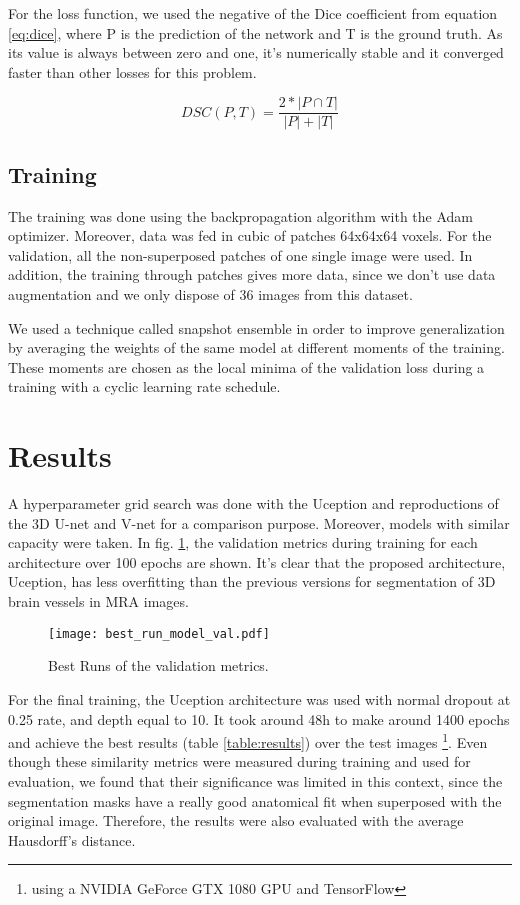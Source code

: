 \documentclass{article}
\begin{document}
For the loss function, we used the negative of the Dice coefficient from equation \ref{eq:dice}, where \textsc{P} is the prediction of the network and \textsc{T} is the ground truth. As its value is always between zero and one, it's numerically stable and it converged faster than other losses for this problem.

\begin{equation}
\label{eq:dice}
DSC(P,T) = \frac{2*|P \cap T|}{ |P|+|T|}
\end{equation}

\subsection{Training}
The training was done using the backpropagation algorithm with the Adam optimizer. Moreover, data was fed in cubic of patches 64x64x64 voxels. For the validation, all the non-superposed patches of one single image were used. In addition, the training through patches gives more data, since we don't use data augmentation and we only dispose of 36 images from this dataset.

We used a technique called snapshot ensemble \cite{Huang2017} in order to improve generalization by averaging the weights of the same model at different moments of the training. These moments are chosen as the local minima of the validation loss during a training with a cyclic learning rate schedule.

\section{Results}

A hyperparameter grid search was done with the Uception and reproductions of the 3D U-net and V-net for a comparison purpose. Moreover, models with similar capacity were taken. In fig. \ref{fig:best_val}, the validation metrics during training for each architecture over 100 epochs are shown. It's clear that the proposed architecture, Uception, has less overfitting than the previous versions for segmentation of 3D brain vessels in MRA images.

\begin{figure}[ht]
\texttt{[image: best\_run\_model\_val.pdf]}
\caption{Best Runs of the validation metrics.}
\label{fig:best_val}
\end{figure}

For the final training, the Uception architecture was used with normal dropout at 0.25 rate, and depth equal to 10. It took around 48h to make around 1400 epochs and achieve the best results (table \ref{table:results}) over the test images \footnote{using a NVIDIA GeForce GTX 1080 GPU and TensorFlow}.  Even though these similarity metrics were measured during training and used for evaluation, we found that their significance was limited in this context, since the segmentation masks have a really good anatomical fit when superposed with the original image. Therefore, the results were also evaluated with the average Hausdorff's distance.
\end{document}
